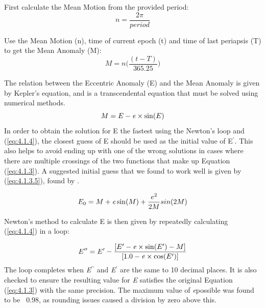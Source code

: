 \documentclass[12pt,preprint]{aastex}
\begin{document}
First calculate the Mean Motion from the provided period:
\begin{equation}\label{eq:4.1.1}
n = \frac{2\pi}{period} 
\end{equation}

Use the Mean Motion (n), time of current epoch (t) and time of last periapsis (T) to get the Mean Anomaly (M):
\begin{equation}\label{eq:4.1.2}
M = n \bigg( \frac{(t-T)}{365.25} \bigg)
\end{equation}

The relation between the Eccentric Anomaly (E) and the Mean Anomaly is given by Kepler's equation, and is a transcendental equation that must be solved using numerical methods.
\begin{equation}\label{eq:4.1.3}
M = E - {\it e}\times\sin(E)
\end{equation}
In order to obtain the solution for E the fastest using the Newton's loop and (\ref{eq:4.1.4}), the closest guess of E should be used as the initial value of E$^{\prime}$.  This also helps to avoid ending up with one of the wrong solutions in cases where there are multiple crossings of the two functions that make up Equation (\ref{eq:4.1.3}).  A suggested initial guess that we found to work well is given by (\ref{eq:4.1.3.5}), found by \citep{Argyle}.

\begin{equation}\label{eq:4.1.3.5}
E_0 = M+{\it e}\sin(M) + \frac{e^2}{2M}sin(2M)
\end{equation}

Newton's method to calculate E is then given by repeatedly calculating (\ref{eq:4.1.4}) in a loop:
  
\begin{equation}\label{eq:4.1.4}
E^{\prime \prime} = E^{\prime} - \frac{[E^{\prime} - {\it e} \times \sin(E^{\prime}) - M]}{[1.0 - {\it e} \times \cos(E^{\prime})]}
\end{equation}
The loop completes when {\it E$^{\prime \prime}$} and {\it E$^{\prime}$} are the same to 10 decimal places.  It is also checked to ensure the resulting value for {\it E} satisfies the original Equation (\ref{eq:4.1.3}) with the same precision.  The maximum value of {\it e}possible was found to be ~0.98, as rounding issues caused a division by zero above this.\\
\end{document}
